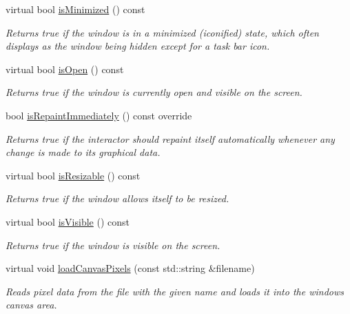 \begin{DoxyCompactItemize}
virtual bool \mbox{\hyperlink{classsgl_1_1GWindow_a14e6f95fa2c9ec543caa7f16f30c53d6}{is\+Minimized}} () const
\begin{DoxyCompactList}\small\item\em Returns true if the window is in a minimized (iconified) state, which often displays as the window being hidden except for a task bar icon. \end{DoxyCompactList}\item 
virtual bool \mbox{\hyperlink{classsgl_1_1GWindow_a002ed331862370f434b7befe331b5a0b}{is\+Open}} () const
\begin{DoxyCompactList}\small\item\em Returns true if the window is currently open and visible on the screen. \end{DoxyCompactList}\item 
bool \mbox{\hyperlink{classsgl_1_1GWindow_a45b1955433b8bf8a449a216b847d87f7}{is\+Repaint\+Immediately}} () const override
\begin{DoxyCompactList}\small\item\em Returns true if the interactor should repaint itself automatically whenever any change is made to its graphical data. \end{DoxyCompactList}\item 
virtual bool \mbox{\hyperlink{classsgl_1_1GWindow_a2afeea3d26d063fa35c104e73275cec7}{is\+Resizable}} () const
\begin{DoxyCompactList}\small\item\em Returns true if the window allows itself to be resized. \end{DoxyCompactList}\item 
virtual bool \mbox{\hyperlink{classsgl_1_1GWindow_a9d8a6cfb13917785c143e74d40e4e2be}{is\+Visible}} () const
\begin{DoxyCompactList}\small\item\em Returns true if the window is visible on the screen. \end{DoxyCompactList}\item 
virtual void \mbox{\hyperlink{classsgl_1_1GWindow_ae2462f15e288c06c5136e31a8ac8151c}{load\+Canvas\+Pixels}} (const std\+::string \&filename)
\begin{DoxyCompactList}\small\item\em Reads pixel data from the file with the given name and loads it into the window\textquotesingle{}s canvas area. \end{DoxyCompactList}\item 

\end{DoxyCompactItemize}
